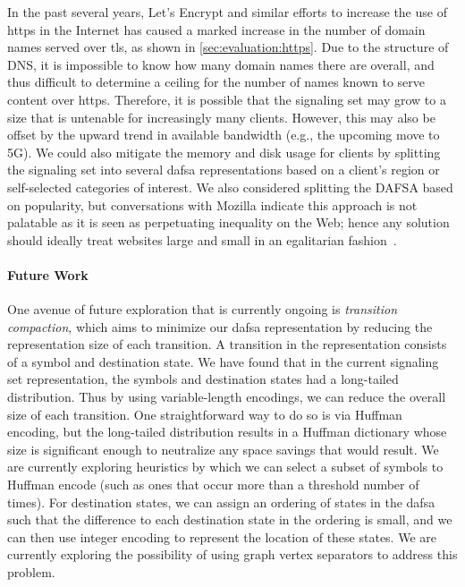 In the past several years, Let's Encrypt and similar efforts to increase
the use of \ac{https} in the Internet has caused a marked increase in the number
of domain names served over \ac{tls}, as shown in
\autoref{sec:evaluation:https}. Due to the structure of DNS, it is impossible to
know how many domain names there are overall, and thus difficult to determine a
ceiling for the number of names known to serve content over \ac{https}.
Therefore, it is possible that the signaling set may grow to a size that is
untenable for increasingly many clients.
However, this may also be offset by the upward trend in available bandwidth
(e.g., the upcoming move to 5G).
We could also mitigate the memory and disk usage for clients by splitting the 
signaling set into several \ac{dafsa} representations based 
on a client's region or self-selected categories of interest.
We also considered splitting the DAFSA based on popularity,
but conversations with Mozilla indicate this approach is not palatable
as it is seen as perpetuating inequality on the Web;
hence any solution should ideally treat websites large and small 
in an egalitarian fashion~\cite{privatecomm}.

\paragraph{Future Work}

One avenue of future exploration that is currently ongoing is \emph{transition
compaction}, which aims to minimize our \ac{dafsa} representation by reducing
the representation size of each transition. A transition in the representation
consists of a symbol and destination state. We have found that in the current
signaling set representation, the symbols and destination states had a
long-tailed distribution. Thus by using variable-length encodings, we can reduce
the overall size of each transition. One straightforward way to do so is via
Huffman encoding, but the long-tailed distribution results in a Huffman
dictionary whose size is significant enough to neutralize any space savings that
would result. We are currently exploring heuristics by which we can select a
subset of symbols to Huffman encode (such as ones that occur more than a
threshold number of times). For destination states, we can assign an ordering of
states in the \ac{dafsa} such that the difference to each destination state in
the ordering is small, and we can then use integer encoding to represent the
location of these states. We are currently exploring the possibility of using
graph vertex separators to address this problem.

